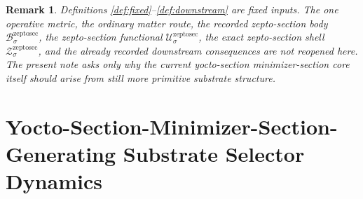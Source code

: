 \documentclass[11pt]{article}
\newcommand{\ZeptoSectionBody}[1]{\mathcal B_{#1}^{\mathrm{zeptosec}}}
\newcommand{\ZeptoSectionFunctional}[1]{\mathscr U_{#1}^{\mathrm{zeptosec}}}
\newcommand{\ZeptoSectionShell}[1]{\mathcal Z_{#1}^{\mathrm{zeptosec}}}
\newtheorem{remark}{Remark}
\begin{document}
\begin{remark}
Definitions \ref{def:fixed}--\ref{def:downstream} are fixed inputs. The one operative metric, the ordinary matter route, the recorded zepto-section body \(\ZeptoSectionBody{\sigma}\), the zepto-section functional \(\ZeptoSectionFunctional{\sigma}\), the exact zepto-section shell \(\ZeptoSectionShell{\sigma}\), and the already recorded downstream consequences are not reopened here. The present note asks only why the current yocto-section minimizer-section core itself should arise from still more primitive substrate structure.
\end{remark}

\section{Yocto-Section-Minimizer-Section-Generating Substrate Selector Dynamics}
\end{document}
